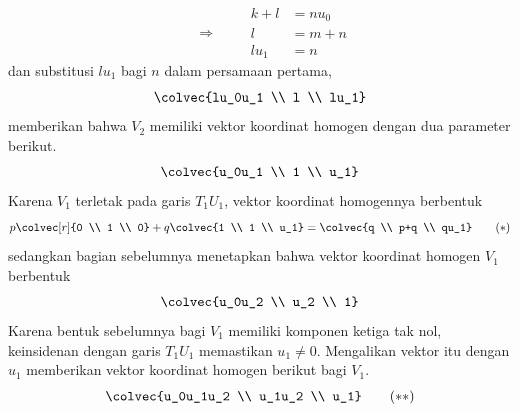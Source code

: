 \begin{exercises}
\begin{answer}
\begin{exparts}
\begin{equation*}
            \qquad\Longrightarrow\qquad
            \begin{aligned}
              k+l  &= nu_0 \\
              l    &= m+n    \\
              lu_1 &= n
            \end{aligned}
           \end{equation*}
           dan substitusi $lu_1$ bagi $n$ dalam persamaan pertama,
           \begin{equation*}
             \colvec{lu_0u_1 \\ l \\ lu_1}
           \end{equation*}
           memberikan bahwa $V_2$ memiliki vektor koordinat homogen dengan
           dua parameter berikut.
           \begin{equation*}
             \colvec{u_0u_1 \\ 1 \\ u_1}
           \end{equation*}
        \partsitem
           Karena $V_1$ terletak pada garis $T_1U_1$, vektor koordinat
           homogennya berbentuk
           \begin{equation*}
             p\colvec[r]{0 \\ 1 \\ 0}+q\colvec{1 \\ 1 \\ u_1}
             =\colvec{q \\ p+q \\ qu_1}
           \tag*{($*$)}\end{equation*}
           sedangkan bagian sebelumnya menetapkan bahwa vektor koordinat
           homogen $V_1$ berbentuk
           \begin{equation*}
            \colvec{u_0u_2 \\ u_2 \\ 1}             
           \end{equation*}
           Karena bentuk sebelumnya bagi $V_1$ memiliki komponen ketiga tak
           nol, keinsidenan dengan garis $T_1U_1$ memastikan $u_1\neq0$.
           Mengalikan vektor itu dengan $u_1$ memberikan vektor koordinat
           homogen berikut bagi $V_1$.
           \begin{equation*}
             \colvec{u_0u_1u_2 \\ u_1u_2 \\ u_1}             
           \tag*{($**$)}\end{equation*}

\end{exparts}
\end{answer}
\end{exercises}
